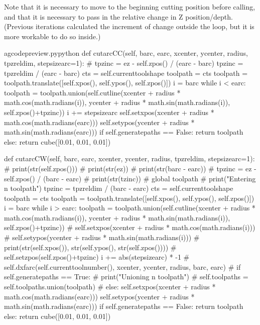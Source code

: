\documentclass{ltxdoc}
\begin{document}

Note that it is necessary to move to the beginning cutting position before calling, and that it is necessary to pass in the relative change in Z position/depth. (Previous iterations calculated the increment of change outside the loop, but it is more workable to do so inside.)

\lstset{firstnumber=\thegcpy}
\begin{writecode}{a}{gcodepreview.py}{python}
    def cutarcCC(self, barc, earc, xcenter, ycenter, radius, tpzreldim, stepsizearc=1):
#        tpzinc = ez - self.zpos() / (earc - barc)
        tpzinc = tpzreldim / (earc - barc)
        cts = self.currenttoolshape
        toolpath = cts
        toolpath = toolpath.translate([self.xpos(), self.ypos(), self.zpos()])
        i = barc
        while i < earc: 
            toolpath = toolpath.union(self.cutline(xcenter + radius * math.cos(math.radians(i)), ycenter + radius * math.sin(math.radians(i)), self.zpos()+tpzinc))
            i += stepsizearc
        self.setxpos(xcenter + radius * math.cos(math.radians(earc)))
        self.setypos(ycenter + radius * math.sin(math.radians(earc)))
        if self.generatepaths == False:
            return toolpath
        else:
            return cube([0.01, 0.01, 0.01])

    def cutarcCW(self, barc, earc, xcenter, ycenter, radius, tpzreldim, stepsizearc=1):
#        print(str(self.zpos()))
#        print(str(ez))
#        print(str(barc - earc))
#        tpzinc = ez - self.zpos() / (barc - earc)
#        print(str(tzinc))
#        global toolpath
#        print("Entering n toolpath")
        tpzinc = tpzreldim / (barc - earc)
        cts = self.currenttoolshape
        toolpath = cts
        toolpath = toolpath.translate([self.xpos(), self.ypos(), self.zpos()])
        i = barc
        while i > earc: 
            toolpath = toolpath.union(self.cutline(xcenter + radius * math.cos(math.radians(i)), ycenter + radius * math.sin(math.radians(i)), self.zpos()+tpzinc))
#            self.setxpos(xcenter + radius * math.cos(math.radians(i)))
#            self.setypos(ycenter + radius * math.sin(math.radians(i)))
#            print(str(self.xpos()), str(self.ypos(), str(self.zpos())))
#            self.setzpos(self.zpos()+tpzinc)
            i += abs(stepsizearc) * -1
#        self.dxfarc(self.currenttoolnumber(), xcenter, ycenter, radius, barc, earc)
#        if self.generatepaths == True:
#            print("Unioning n toolpath")
#            self.toolpaths = self.toolpaths.union(toolpath)
#        else:
        self.setxpos(xcenter + radius * math.cos(math.radians(earc)))
        self.setypos(ycenter + radius * math.sin(math.radians(earc)))
        if self.generatepaths == False:
            return toolpath
        else:
            return cube([0.01, 0.01, 0.01])

\end{writecode}
\addtocounter{gcpy}{49}
\end{document}
